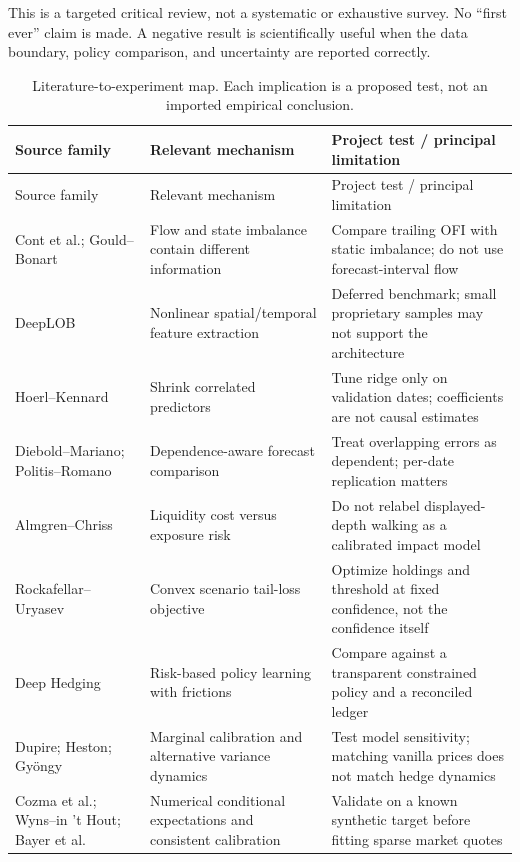 This is a targeted critical review, not a systematic or exhaustive survey. No ``first ever'' claim is made. A negative result is scientifically useful when the data boundary, policy comparison, and uncertainty are reported correctly.

\begin{longtable}{@{}p{31mm}p{53mm}p{66mm}@{}}
\caption{Literature-to-experiment map. Each implication is a proposed test, not an imported empirical conclusion.}\label{tab:literature}\\
\toprule
Source family & Relevant mechanism & Project test / principal limitation\\\midrule
\endfirsthead
\toprule Source family & Relevant mechanism & Project test / principal limitation\\\midrule
\endhead
Cont et al.; Gould--Bonart & Flow and state imbalance contain different information & Compare trailing OFI with static imbalance; do not use forecast-interval flow\\
DeepLOB & Nonlinear spatial/temporal feature extraction & Deferred benchmark; small proprietary samples may not support the architecture\\
Hoerl--Kennard & Shrink correlated predictors & Tune ridge only on validation dates; coefficients are not causal estimates\\
Diebold--Mariano; Politis--Romano & Dependence-aware forecast comparison & Treat overlapping errors as dependent; per-date replication matters\\
Almgren--Chriss & Liquidity cost versus exposure risk & Do not relabel displayed-depth walking as a calibrated impact model\\
Rockafellar--Uryasev & Convex scenario tail-loss objective & Optimize holdings and threshold at fixed confidence, not the confidence itself\\
Deep Hedging & Risk-based policy learning with frictions & Compare against a transparent constrained policy and a reconciled ledger\\
Dupire; Heston; Gy\"ongy & Marginal calibration and alternative variance dynamics & Test model sensitivity; matching vanilla prices does not match hedge dynamics\\
Cozma et al.; Wyns--in 't Hout; Bayer et al. & Numerical conditional expectations and consistent calibration & Validate on a known synthetic target before fitting sparse market quotes\\
\bottomrule
\end{longtable}

